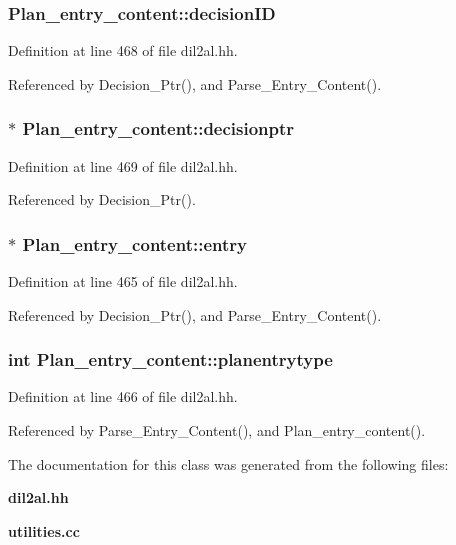 \subsubsection{ Plan\_\-entry\_\-content::decision\-ID\hspace{0.3cm}{\tt  [protected]}}\label{classPlan__entry__content_n3}




Definition at line 468 of file dil2al.hh.

Referenced by Decision\_\-Ptr(), and Parse\_\-Entry\_\-Content().
\subsubsection{$\ast$ Plan\_\-entry\_\-content::decisionptr\hspace{0.3cm}{\tt  [protected]}}\label{classPlan__entry__content_n4}




Definition at line 469 of file dil2al.hh.

Referenced by Decision\_\-Ptr().
\subsubsection{$\ast$ Plan\_\-entry\_\-content::entry\hspace{0.3cm}{\tt  [protected]}}\label{classPlan__entry__content_n0}




Definition at line 465 of file dil2al.hh.

Referenced by Decision\_\-Ptr(), and Parse\_\-Entry\_\-Content().
\subsubsection{\setlength{\rightskip}{0pt plus 5cm}int Plan\_\-entry\_\-content::planentrytype\hspace{0.3cm}{\tt  [protected]}}\label{classPlan__entry__content_n1}




Definition at line 466 of file dil2al.hh.

Referenced by Parse\_\-Entry\_\-Content(), and Plan\_\-entry\_\-content().

The documentation for this class was generated from the following files:\begin{CompactItemize}
\item 
{\bf dil2al.hh}\item 
{\bf utilities.cc}\end{CompactItemize}
